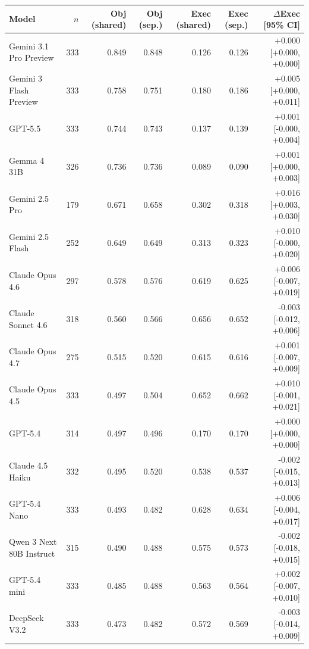 \begin{tabular}{lrrrrrr}
\toprule
Model & $n$ & Obj (shared) & Obj (sep.) & Exec (shared) & Exec (sep.) & $\Delta$Exec [95\% CI] \\
\midrule
Gemini 3.1 Pro Preview & 333 & 0.849 & 0.848 & 0.126 & 0.126 & +0.000 [+0.000, +0.000] \\
Gemini 3 Flash Preview & 333 & 0.758 & 0.751 & 0.180 & 0.186 & +0.005 [+0.000, +0.011] \\
GPT-5.5 & 333 & 0.744 & 0.743 & 0.137 & 0.139 & +0.001 [-0.000, +0.004] \\
Gemma 4 31B & 326 & 0.736 & 0.736 & 0.089 & 0.090 & +0.001 [+0.000, +0.003] \\
Gemini 2.5 Pro & 179 & 0.671 & 0.658 & 0.302 & 0.318 & +0.016 [+0.003, +0.030] \\
Gemini 2.5 Flash & 252 & 0.649 & 0.649 & 0.313 & 0.323 & +0.010 [-0.000, +0.020] \\
Claude Opus 4.6 & 297 & 0.578 & 0.576 & 0.619 & 0.625 & +0.006 [-0.007, +0.019] \\
Claude Sonnet 4.6 & 318 & 0.560 & 0.566 & 0.656 & 0.652 & -0.003 [-0.012, +0.006] \\
Claude Opus 4.7 & 275 & 0.515 & 0.520 & 0.615 & 0.616 & +0.001 [-0.007, +0.009] \\
Claude Opus 4.5 & 333 & 0.497 & 0.504 & 0.652 & 0.662 & +0.010 [-0.001, +0.021] \\
GPT-5.4 & 314 & 0.497 & 0.496 & 0.170 & 0.170 & +0.000 [+0.000, +0.000] \\
Claude 4.5 Haiku & 332 & 0.495 & 0.520 & 0.538 & 0.537 & -0.002 [-0.015, +0.013] \\
GPT-5.4 Nano & 333 & 0.493 & 0.482 & 0.628 & 0.634 & +0.006 [-0.004, +0.017] \\
Qwen 3 Next 80B Instruct & 315 & 0.490 & 0.488 & 0.575 & 0.573 & -0.002 [-0.018, +0.015] \\
GPT-5.4 mini & 333 & 0.485 & 0.488 & 0.563 & 0.564 & +0.002 [-0.007, +0.010] \\
DeepSeek V3.2 & 333 & 0.473 & 0.482 & 0.572 & 0.569 & -0.003 [-0.014, +0.009] \\
\bottomrule
\end{tabular}
